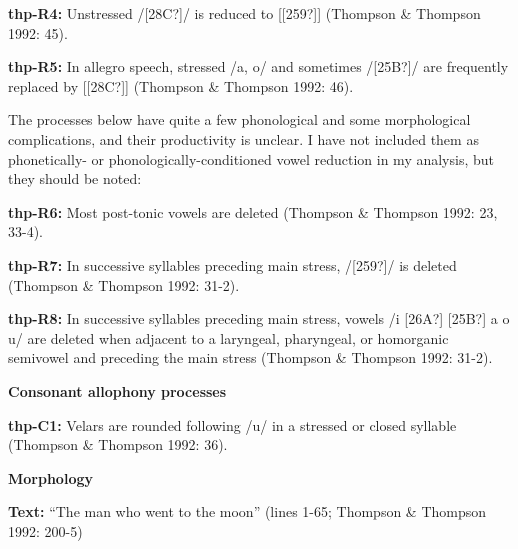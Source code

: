 \begin{styleBody}
\textbf{thp-R4:} Unstressed /[28C?]/ is reduced to [[259?]] (Thompson \& Thompson 1992: 45).
\end{styleBody}

\begin{styleBody}
\textbf{thp-R5:} In allegro speech, stressed /a, o/ and sometimes /[25B?]/ are frequently replaced by [[28C?]] (Thompson \& Thompson 1992: 46).
\end{styleBody}

\begin{styleBody}
The processes below have quite a few phonological and some morphological complications, and their productivity is unclear. I have not included them as phonetically- or phonologically-conditioned vowel reduction in my analysis, but they should be noted:
\end{styleBody}

\begin{styleBody}
\textbf{thp-R6:} Most post-tonic vowels are deleted (Thompson \& Thompson 1992: 23, 33-4).
\end{styleBody}

\begin{styleBody}
\textbf{thp-R7:} In successive syllables preceding main stress, /[259?]/ is deleted (Thompson \& Thompson 1992: 31-2).
\end{styleBody}

\begin{styleBody}
\textbf{thp-R8:} In successive syllables preceding main stress, vowels /i [26A?] [25B?] a o u/ are deleted when adjacent to a laryngeal, pharyngeal, or homorganic semivowel and preceding the main stress (Thompson \& Thompson 1992: 31-2).
\end{styleBody}

\begin{styleBody}
\textbf{Consonant allophony processes}
\end{styleBody}

\begin{styleBody}
\textbf{thp-C1: }Velars are rounded following /u/ in a stressed or closed syllable (Thompson \& Thompson 1992: 36).
\end{styleBody}

\begin{styleBody}
\textbf{Morphology}
\end{styleBody}

\begin{styleBody}
\textbf{Text: }“The man who went to the moon” (lines 1-65; Thompson \& Thompson 1992: 200-5)
\end{styleBody}

